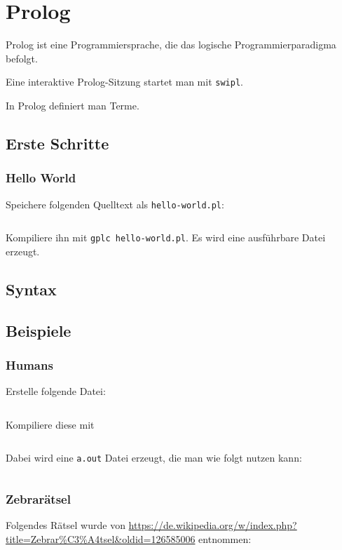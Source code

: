 \chapter{Prolog}

Prolog ist eine Programmiersprache, die das logische Programmierparadigma
befolgt.

Eine interaktive Prolog-Sitzung startet man mit \texttt{swipl}.

In Prolog definiert man Terme.
\section{Erste Schritte}
\subsection{Hello World}
Speichere folgenden Quelltext als \texttt{hello-world.pl}:
\inputminted[linenos, numbersep=5pt, tabsize=4, frame=lines, label=hello-world.hs]{prolog}{scripts/prolog/hello-world.pl}

Kompiliere ihn mit \texttt{gplc hello-world.pl}. Es wird eine
ausführbare Datei erzeugt.

\section{Syntax}
\section{Beispiele}
\subsection{Humans}
Erstelle folgende Datei:
\inputminted[linenos, numbersep=5pt, tabsize=4, frame=lines, label=human.pro]{prolog}{scripts/prolog/human.pro}

Kompiliere diese mit
\inputminted[numbersep=5pt, tabsize=4]{bash}{scripts/prolog/human.sh}

Dabei wird eine \texttt{a.out} Datei erzeugt, die man wie folgt
nutzen kann:
\inputminted[numbersep=5pt, tabsize=4]{bash}{scripts/prolog/human-2.sh}

\subsection{Zebrarätsel}
Folgendes Rätsel wurde von \url{https://de.wikipedia.org/w/index.php?title=Zebrar%C3%A4tsel&oldid=126585006}
entnommen:

